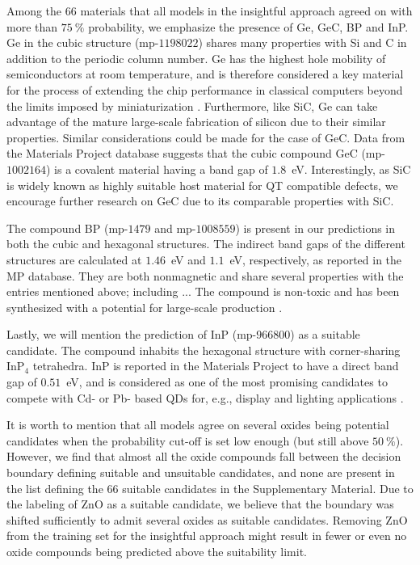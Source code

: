 \documentclass[superscriptaddress,unsortedaddress,
 amsmath,amssymb,
 aps,
]{revtex4-2}
\begin{document}
Among the $66$ materials that all models in the insightful approach agreed on with more than $75 \ \%$ probability, we emphasize the presence of Ge, GeC, BP and InP. Ge in the cubic structure (mp-$1198022$) shares many properties with Si and C in addition to the periodic column number. 
Ge has the highest hole mobility of semiconductors at room temperature, and is therefore considered a key material for the process of extending the chip performance in classical computers beyond the limits imposed by miniaturization  \cite{Scappucci2020}. Furthermore, like SiC, Ge can take advantage of the mature large-scale fabrication of silicon due to their similar properties. 
Similar considerations could be made for the case of GeC. 
Data from the Materials Project database suggests that the cubic compound GeC (mp-$1002164$) is a covalent material having a band gap of $1.8$~eV. 
Interestingly, as SiC is widely known as highly suitable host material for QT compatible defects, we encourage further research on GeC due to its comparable properties with SiC.

The compound BP (mp-$1479$ and mp-$1008559$) is present in our predictions in both the cubic and hexagonal structures. The indirect band gaps of the different structures are calculated at $1.46$~eV and $1.1$~eV, respectively, as reported in the MP database. They are both nonmagnetic and share several properties with the entries mentioned above; including ... The compound is non-toxic and has been synthesized with a potential for large-scale production \cite{MukhanovVladimirA2016Umso}.

Lastly, we will mention the prediction of InP (mp-$966800$) as a suitable candidate. The compound inhabits the hexagonal structure with corner-sharing InP$_4$ tetrahedra. InP is reported in the Materials Project to have a direct band gap of $0.51$~eV, and is considered as one of the most promising candidates 
to compete with 
Cd- or Pb- based QDs for, e.g., display and lighting applications \cite{Zhang2020a, Won2019}.

It is worth to mention that all models agree on several oxides being potential candidates when the probability cut-off is set low enough (but still above $50 \ \%$). However, we find that almost all the oxide compounds fall between the decision boundary defining suitable and unsuitable candidates, and none are present in the list defining the $66$ suitable candidates in the Supplementary Material. Due to the labeling of ZnO as a suitable candidate, we believe that the boundary was shifted sufficiently to admit several oxides as suitable candidates.
Removing ZnO from the training set for the insightful approach might result in fewer or even no oxide compounds being predicted above the suitability limit. 
\end{document}
